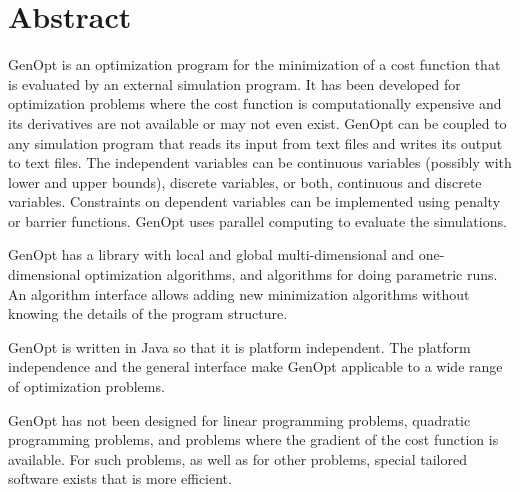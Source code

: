 \chapter{Abstract}
GenOpt is an optimization program for the minimization 
of a cost function that is evaluated by an external simulation program.
It has been developed for optimization problems where the cost function
is computationally expensive and its derivatives are not available or
may not even exist.
GenOpt can be coupled to any simulation program 
that reads its input from text files
and writes its output to text files.
The independent variables can be continuous variables 
(possibly with lower and upper bounds), discrete variables, or both, 
continuous and discrete variables.
Constraints on dependent variables can be implemented using penalty 
or barrier functions.
GenOpt uses parallel computing to evaluate the simulations.

GenOpt has a library with local and global multi-dimensional and 
one-dimensional optimization algorithms, 
and algorithms for doing parametric runs.
An algorithm interface allows adding
new minimization algorithms without
knowing the details of the program structure.

GenOpt is written in Java so that it is platform independent.
The platform independence and the general interface make GenOpt applicable 
to a wide range of optimization problems.

GenOpt has not been designed for linear programming problems,
quadratic programming problems, and problems 
where the gradient of the cost function is available. For such problems,
as well as for other problems,
special tailored software exists that is more efficient.


